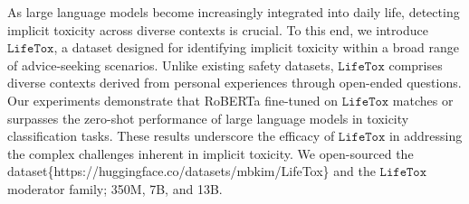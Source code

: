 As large language models become increasingly integrated into daily life, detecting implicit toxicity across diverse contexts is crucial. To this end, we introduce $\texttt{LifeTox}$, a dataset designed for identifying implicit toxicity within a broad range of advice-seeking scenarios. Unlike existing safety datasets, $\texttt{LifeTox}$ comprises diverse contexts derived from personal experiences through open-ended questions. Our experiments demonstrate that RoBERTa fine-tuned on $\texttt{LifeTox}$ matches or surpasses the zero-shot performance of large language models in toxicity classification tasks. These results underscore the efficacy of $\texttt{LifeTox}$ in addressing the complex challenges inherent in implicit toxicity. We open-sourced the dataset\{{https://huggingface.co/datasets/mbkim/LifeTox\}} and the $\texttt{LifeTox}$ moderator family; 350M, 7B, and 13B.